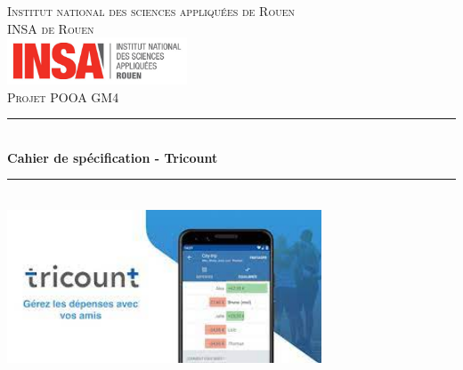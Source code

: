\documentclass[12,french]{report}
\newcommand{\HRule}{\rule{\linewidth}{0.5mm}}
\begin{document}
\hypersetup{pdfborder=0 0 0}

\begin{titlepage}

\begin{center}
	\textsc{{\LARGE Institut national des sciences appliquées de Rouen} \\ 			\vspace{6mm} {\Large INSA de Rouen}} \\
	\vspace{5mm}
	\includegraphics[width=0.4\textwidth]{./Images/insa}\\[1.0 cm]

	\textsc{\Large Projet POOA GM4}\\[0.6cm]

	\HRule \\[0.5cm]
	{ \Huge \bfseries Cahier de spécification - Tricount}\\[0.2cm]
	\HRule \\[0.75cm]

	\includegraphics[width=0.7\textwidth]{./Images/Tricount}\\[0.9 cm]


\end{center}
\end{titlepage}
\end{document}
